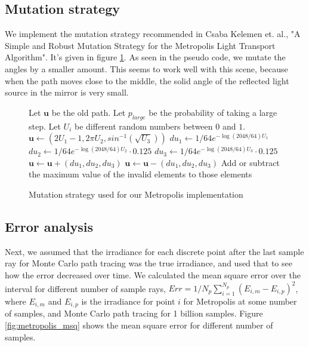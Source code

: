 \documentclass{article} %
\begin{document}
\subsection*{Mutation strategy}
We implement the mutation strategy recommended in Csaba Kelemen et. al., "A Simple and Robust Mutation Strategy for the Metropolis Light Transport Algorithm". It's given in figure \ref{fig:mutation_metropolis}. As seen in the pseudo code, we mutate the angles by a smaller amount. This seems to work well with this scene, because when the path moves close to the middle, the solid angle of the reflected light source in the mirror is very small.

\begin{figure}[h]
\begin{algorithmic}
\STATE Let $\mathbf{u}$ be the old path.
\STATE Let $p_{large}$ be the probability of taking a large step.
\STATE Let $U_i$ be different random numbers between $0$ and $1$. 
    \STATE $\mathbf{u} \gets \left( 2U_1-1, 2\pi U_2, sin^{-1}(\sqrt{U_3})\right)$
\ELSE
    \STATE $du_1 \gets 1/64 e^{-\log(2048/64)U_1}$
    \STATE $du_2 \gets 1/64 e^{-\log(2048/64)U_2}\cdot 0.125$
    \STATE $du_3 \gets 1/64 e^{-\log(2048/64)U_3}\cdot 0.125$
        \STATE $\mathbf{u} \gets \mathbf{u} + (du_1, du_2, du_3)$
    \ELSE
        \STATE $\mathbf{u} \gets \mathbf{u} - (du_1, du_2, du_3)$
    \ENDIF
        \STATE Add or subtract the maximum value of the invalid elements to those elements
    \ENDIF
\ENDIF
\end{algorithmic}
\caption{Mutation strategy used for our Metropolis implementation}
\label{fig:mutation_metropolis}
\end{figure}

\subsection*{Error analysis}
Next, we assumed that the irradiance for each discrete point after the last sample ray for Monte Carlo path tracing was the true irradiance, and used that to see how the error decreased over time. We calculated the mean square error over the interval for different number of sample rays, $Err = 1/N_p \sum_{i=1}^{N_p} (E_{i,m} - E_{i,p})^2$, where $E_{i,m}$ and $E_{i,p}$ is the irradiance for point $i$ for Metropolis at some number of samples, and Monte Carlo path tracing for 1 billion samples. Figure \ref{fig:metropolis_msq} shows the mean square error for different number of samples.
\end{document}

